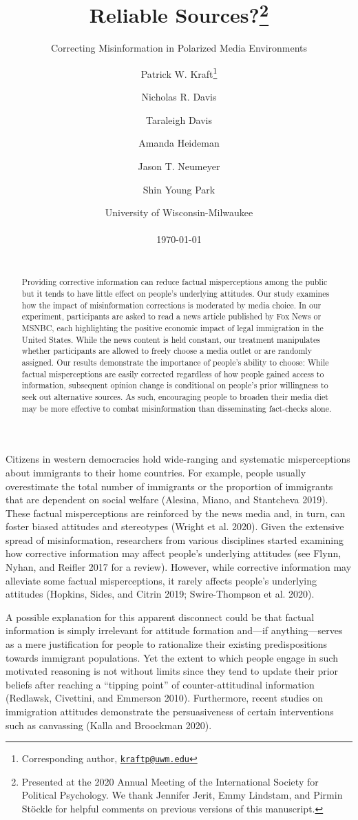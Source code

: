 \documentclass[
  12pt,
]{article}
\title{Reliable Sources?\footnote{Presented at the 2020 Annual Meeting
  of the International Society for Political Psychology. We thank
  Jennifer Jerit, Emmy Lindstam, and Pirmin Stöckle for helpful comments
  on previous versions of this manuscript.}}
\subtitle{Correcting Misinformation in Polarized Media Environments
\vspace{1em}}
\author{Patrick W. Kraft\footnote{Corresponding author,
  \href{mailto:kraftp@uwm.edu}{\nolinkurl{kraftp@uwm.edu}}} \and Nicholas
R. Davis \and Taraleigh Davis \and Amanda Heideman \and Jason T.
Neumeyer \and Shin Young Park}
\date{\hfill\break
University of Wisconsin-Milwaukee\\
~\\
\today\\
~\\}
\begin{document}
\maketitle
\begin{abstract}
\noindent Providing corrective information can reduce factual
misperceptions among the public but it tends to have little effect on
people's underlying attitudes. Our study examines how the impact of
misinformation corrections is moderated by media choice. In our
experiment, participants are asked to read a news article published by
Fox News or MSNBC, each highlighting the positive economic impact of
legal immigration in the United States. While the news content is held
constant, our treatment manipulates whether participants are allowed to
freely choose a media outlet or are randomly assigned. Our results
demonstrate the importance of people's ability to choose: While factual
misperceptions are easily corrected regardless of how people gained
access to information, subsequent opinion change is conditional on
people's prior willingness to seek out alternative sources. As such,
encouraging people to broaden their media diet may be more effective to
combat misinformation than disseminating fact-checks alone.
\end{abstract}

\thispagestyle{empty}
\clearpage
\setcounter{page}{1}
\doublespace

\StopCensoring

\noindent Citizens in western democracies hold wide-ranging and
systematic misperceptions about immigrants to their home countries. For
example, people usually overestimate the total number of immigrants or
the proportion of immigrants that are dependent on social welfare
(Alesina, Miano, and Stantcheva 2019). These factual misperceptions are
reinforced by the news media and, in turn, can foster biased attitudes
and stereotypes (Wright et al. 2020). Given the extensive spread of
misinformation, researchers from various disciplines started examining
how corrective information may affect people's underlying attitudes (see
Flynn, Nyhan, and Reifler 2017 for a review). However, while corrective
information may alleviate some factual misperceptions, it rarely affects
people's underlying attitudes (Hopkins, Sides, and Citrin 2019;
Swire-Thompson et al. 2020).

A possible explanation for this apparent disconnect could be that
factual information is simply irrelevant for attitude formation and---if
anything---serves as a mere justification for people to rationalize
their existing predispositions towards immigrant populations. Yet the
extent to which people engage in such motivated reasoning is not without
limits since they tend to update their prior beliefs after reaching a
``tipping point'' of counter-attitudinal information (Redlawsk,
Civettini, and Emmerson 2010). Furthermore, recent studies on
immigration attitudes demonstrate the persuasiveness of certain
interventions such as canvassing (Kalla and Broockman 2020).
\end{document}
